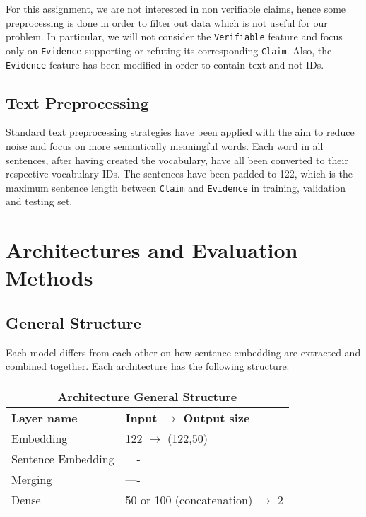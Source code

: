 \documentclass[10pt,twocolumn,letterpaper]{article}
\begin{document}
For this assignment, we are not interested in non verifiable claims, hence some preprocessing is done in order to filter out data which is not useful for our problem. In particular, we will not consider the \texttt{Verifiable} feature and focus only on \texttt{Evidence} supporting or refuting its corresponding \texttt{Claim}. Also, the \texttt{Evidence} feature has been modified in order to contain text and not IDs.\\
\subsection{Text Preprocessing}
Standard text preprocessing strategies have been applied with the aim to reduce noise and focus on more semantically meaningful words. Each word in all sentences, after having created the vocabulary, have all been converted to their respective vocabulary IDs. The sentences have been padded to 122, which is the maximum sentence length between \texttt{Claim} and \texttt{Evidence} in training, validation and testing set.

\section{Architectures and Evaluation Methods}

\subsection{General Structure}
Each model differs from each other on how sentence embedding are extracted and combined together. Each architecture has the following structure:\\

\begin{tabular}{ |p{2cm}|p{3cm}|  }
\hline
\multicolumn{2}{|c|}{\textbf{Architecture General Structure}} \\
\hline
\textbf{Layer name}& \textbf{Input $\rightarrow$ Output size} \\
\hline
Embedding & 122 $\rightarrow$ (122,50) \\\hline
Sentence Embedding & ---- \\\hline
Merging & ---- \\\hline
Dense & 50 or 100 (concatenation) $\rightarrow$ 2 \\
\hline
\end{tabular}\vspace{0.5cm}
\\
\end{document}
